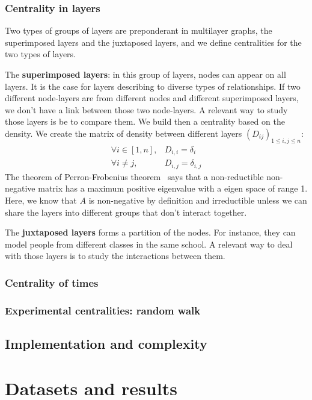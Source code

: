 \documentclass{svproc}
\begin{document}
\subsubsection{Centrality in layers}

Two types of groups of layers are preponderant in multilayer graphs, the superimposed layers and the juxtaposed layers, and we define centralities for the two types of layers.

The {\bf superimposed layers}: in this group of layers, nodes can appear on all layers. It is the case for layers describing to diverse types of relationships. If two different node-layers are from different nodes and different superimposed layers, we don't have a link between those two node-layers. A relevant way to study those layers is be to compare them.
We build then a centrality based on the density. We create the matrix of density between different layers $(D_{ij})_{1\leq i,j\leq n}$:
\begin{align*}
\forall i \in [1,n], & D_{i,i} = \delta_i \\
\forall i \neq j , & D_{i,j} = \delta_{i,j}
\end{align*}
The theorem of Perron-Frobenius theorem~\cite{perron,frobenius} says that a non-reductible non-negative matrix has a maximum positive eigenvalue with a eigen space of range 1. Here, we know that $A$ is non-negative by definition and irreductible unless we can share the layers into different groups that don't interact together.

The {\bf juxtaposed layers} forms a partition of the nodes. For instance, they can model people from different classes in the same school. A relevant way to deal with those layers is to study the interactions between them.


\subsubsection{Centrality of times}
%
\subsubsection{Experimental centralities: random walk}
%
\subsection{Implementation and complexity}
%

\section{Datasets and results}
%
\end{document}
